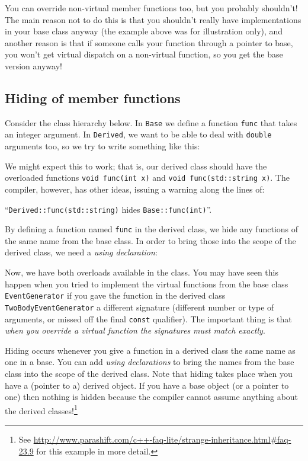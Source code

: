 \documentclass[a4paper]{scrartcl}
\begin{document}
You can override non-virtual member functions too, but you probably shouldn't! The main reason not to do this is that you shouldn't really have implementations in your base class anyway (the example above was for illustration only), and another reason is that if someone calls your function through a pointer to base, you won't get virtual dispatch on a non-virtual function, so you get the base version anyway!

\subsection{Hiding of member functions}
Consider the class hierarchy below. In \verb|Base| we define a function \verb|func| that takes an integer argument. In \verb|Derived|, we want to be able to deal with \verb|double| arguments too, so we try to write something like this:



We might expect this to work; that is, our derived class should have the overloaded functions \texttt{void func(int x)} and \texttt{void func(std::string x)}. The compiler, however, has other ideas, issuing a warning along the lines of:

``\texttt{Derived::func(std::string)} hides \texttt{Base::func(int)}''.

By defining a function named \verb|func| in the derived class, we hide any functions of the same name from the base class. In order to bring those into the scope of the derived class, we need a \emph{using declaration}:



Now, we have both overloads available in the class. You may have seen this happen when you tried to implement the virtual functions from the base class \verb|EventGenerator| if you gave the function in the derived class \verb|TwoBodyEventGenerator| a different signature (different number or type of arguments, or missed off the final \verb|const| qualifier). The important thing is that \emph{when you override a virtual function the signatures must match exactly}.

Hiding occurs whenever you give a function in a derived class the same name as one in a base. You can add \emph{using declarations} to bring the names from the base class into the scope of the derived class. Note that hiding takes place when you have a (pointer to a) derived object. If you have a base object (or a pointer to one) then nothing is hidden because the compiler cannot assume anything about the derived classes!\footnote{See \url{http://www.parashift.com/c++-faq-lite/strange-inheritance.html\#faq-23.9} for this example in more detail.}
\end{document}
